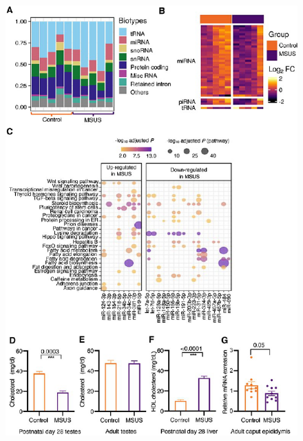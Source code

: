 \documentclass[12pt,twoside]{reedthesis}
\begin{document}
\begin{figure}[htbp]

{\centering \includegraphics{thesis_files/figure-latex/ef3-1} 

}


\end{figure}
\end{document}
